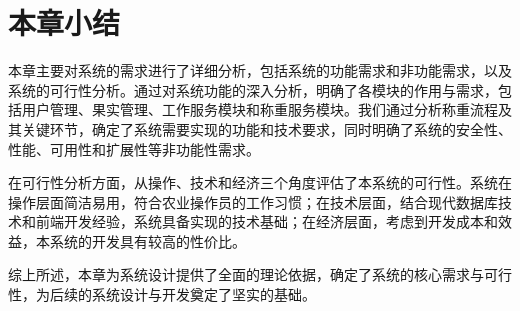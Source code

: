 \section{本章小结}

本章主要对系统的需求进行了详细分析，包括系统的功能需求和非功能需求，以及系统的可行性分析。通过对系统功能的深入分析，明确了各模块的作用与需求，包括用户管理、果实管理、工作服务模块和称重服务模块。我们通过分析称重流程及其关键环节，确定了系统需要实现的功能和技术要求，同时明确了系统的安全性、性能、可用性和扩展性等非功能性需求。

在可行性分析方面，从操作、技术和经济三个角度评估了本系统的可行性。系统在操作层面简洁易用，符合农业操作员的工作习惯；在技术层面，结合现代数据库技术和前端开发经验，系统具备实现的技术基础；在经济层面，考虑到开发成本和效益，本系统的开发具有较高的性价比。

综上所述，本章为系统设计提供了全面的理论依据，确定了系统的核心需求与可行性，为后续的系统设计与开发奠定了坚实的基础。

